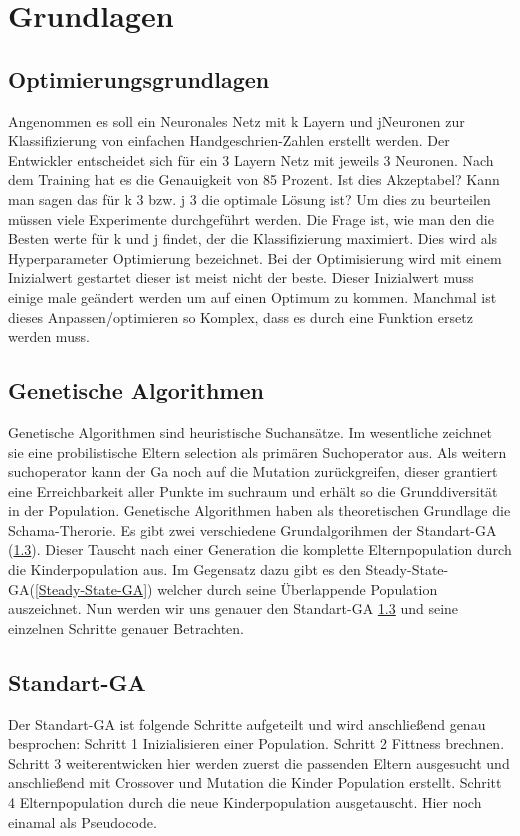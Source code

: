 \section{Grundlagen}
\label{sec:Grundlagen}


\subsection{Optimierungsgrundlagen}
Angenommen es soll ein Neuronales Netz mit k Layern und jNeuronen zur Klassifizierung von einfachen Handgeschrien-Zahlen erstellt werden. Der Entwickler entscheidet sich für ein 3 Layern Netz mit jeweils 3 Neuronen. Nach dem Training hat es die Genauigkeit von 85 Prozent. Ist dies Akzeptabel? Kann man sagen das für k 3 bzw. j 3 die optimale Lösung ist? Um dies zu beurteilen müssen viele Experimente durchgeführt werden. Die Frage ist, wie man den die Besten werte für k und j findet, der die Klassifizierung maximiert. Dies wird als Hyperparameter Optimierung bezeichnet. Bei der Optimisierung wird mit einem Inizialwert gestartet dieser ist meist nicht der beste. Dieser Inizialwert muss einige male geändert werden um auf einen Optimum zu kommen. Manchmal ist dieses Anpassen/optimieren so Komplex, dass es durch eine Funktion ersetz werden muss.

\subsection{Genetische Algorithmen}
Genetische Algorithmen sind heuristische Suchansätze. Im wesentliche zeichnet sie eine probilistische Eltern selection als primären Suchoperator aus. Als weitern suchoperator kann der Ga noch auf die Mutation zurückgreifen, dieser grantiert eine Erreichbarkeit aller Punkte im suchraum und erhält so die Grunddiversität in der Population. Genetische Algorithmen haben als theoretischen Grundlage die Schama-Therorie. Es gibt zwei verschiedene Grundalgorihmen der Standart-GA (\ref{Standart-GA}). Dieser Tauscht nach einer Generation die komplette Elternpopulation durch die Kinderpopulation aus. Im Gegensatz dazu gibt es  den Steady-State-GA(\ref{Steady-State-GA}) welcher durch seine Überlappende Population auszeichnet. Nun werden wir uns genauer den  Standart-GA \ref{Standart-GA} und seine einzelnen Schritte genauer Betrachten.

\subsection{Standart-GA} \label{Standart-GA}
Der Standart-GA ist folgende Schritte aufgeteilt und wird anschließend genau besprochen:
Schritt 1 Inizialisieren einer Population.
Schritt 2 Fittness brechnen.
Schritt 3 weiterentwicken hier werden zuerst die passenden Eltern ausgesucht und anschließend mit Crossover und Mutation die Kinder Population erstellt. 
Schritt 4 Elternpopulation durch die neue Kinderpopulation ausgetauscht.
Hier noch einamal als Pseudocode.

